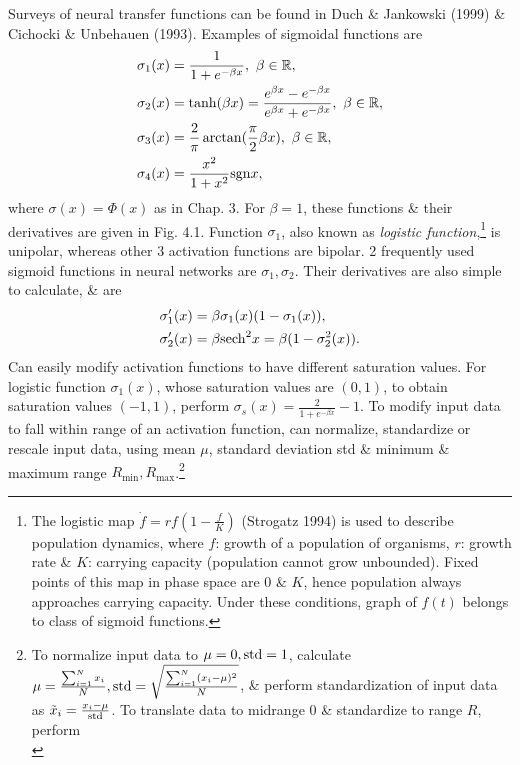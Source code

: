 \documentclass{article}
\begin{document}
\begin{enumerate}
\begin{itemize}
\begin{itemize}
			Surveys of neural transfer functions can be found in Duch \& Jankowski (1999) \& Cichocki \& Unbehauen (1993). Examples of sigmoidal functions are
			\begin{align}
				\sigma_1(x) &= \frac{1}{1 + e^{-\beta x}},\ \beta\in\mathbb{R},\\
				\sigma_2(x) &= \tanh(\beta x) = \frac{e^{\beta x} - e^{-\beta x}}{e^{\beta x} + e^{-\beta x}},\ \beta\in\mathbb{R},\\
				\sigma_3(x) &= \frac{2}{\pi}\arctan(\frac{\pi}{2}\beta x),\ \beta\in\mathbb{R},\\
				\sigma_4(x) &= \frac{x^2} {1 + x^2}{\rm sgn}x,
			\end{align}
			where $\sigma(x) = \Phi(x)$ as in Chap. 3. For $\beta = 1$, these functions \& their derivatives are given in Fig. 4.1. Function $\sigma_1$, also known as {\it logistic function},\footnote{The logistic map $\dot{f} = rf\left(1 - \frac{f}{K}\right)$ (Strogatz 1994) is used to describe population dynamics, where $f$: growth of a population of organisms, $r$: growth rate \& $K$: carrying capacity (population cannot grow unbounded). Fixed points of this map in phase space are 0 \& $K$, hence population always approaches carrying capacity. Under these conditions, graph of $f(t)$ belongs to class of sigmoid functions.} is unipolar, whereas other 3 activation functions are bipolar. 2 frequently used sigmoid functions in neural networks are $\sigma_1,\sigma_2$. Their derivatives are also simple to calculate, \& are
			\begin{align}
				\sigma_1'(x) &= \beta\sigma_1(x)(1 - \sigma_1(x)),\\
				\sigma_2'(x) &= \beta{\rm sech}^2x = \beta(1 - \sigma_2^2(x)).
			\end{align}
			Can easily modify activation functions to have different saturation values. For logistic function $\sigma_1(x)$, whose saturation values are $(0,1)$, to obtain saturation values $(-1,1)$, perform $\sigma_s(x) = \frac{2}{1 + e^{-\beta x}} - 1$. To modify input data to fall within range of an activation function, can normalize, standardize or rescale input data, using mean $\mu$, standard deviation std \& minimum \& maximum range $R_{\min},R_{\max}$.\footnote{To normalize input data to $\mu = 0,{\rm std} = 1$, calculate $\mu = \frac{\sum_{i=1}^N x_i}{N},{\rm std} = \sqrt{\frac{\sum_{i=1}^N (x_i - \mu)^2}{N}}$, \& perform standardization of input data as $\tilde{x}_i = \frac{x_i - \mu}{{\rm std}}$. To translate data to midrange 0 \& standardize to range $R$, perform
			\begin{equation}

\end{equation}}
\end{itemize}
\end{itemize}
\end{enumerate}
\end{document}
